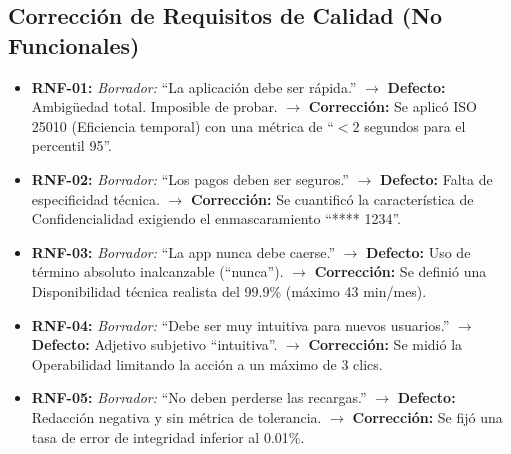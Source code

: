 \documentclass[12pt,a4paper]{article}
\begin{document}
\subsection{Corrección de Requisitos de Calidad (No Funcionales)}
\begin{itemize}
    \item \textbf{RNF-01:} \textit{Borrador:} ``La aplicación debe ser rápida.'' $\rightarrow$ \textbf{Defecto:} Ambigüedad total. Imposible de probar. $\rightarrow$ \textbf{Corrección:} Se aplicó ISO 25010 (Eficiencia temporal) con una métrica de ``$<2$ segundos para el percentil 95''.
    \item \textbf{RNF-02:} \textit{Borrador:} ``Los pagos deben ser seguros.'' $\rightarrow$ \textbf{Defecto:} Falta de especificidad técnica. $\rightarrow$ \textbf{Corrección:} Se cuantificó la característica de Confidencialidad exigiendo el enmascaramiento ``**** 1234''.
    \item \textbf{RNF-03:} \textit{Borrador:} ``La app nunca debe caerse.'' $\rightarrow$ \textbf{Defecto:} Uso de término absoluto inalcanzable (``nunca''). $\rightarrow$ \textbf{Corrección:} Se definió una Disponibilidad técnica realista del 99.9\% (máximo 43 min/mes).
    \item \textbf{RNF-04:} \textit{Borrador:} ``Debe ser muy intuitiva para nuevos usuarios.'' $\rightarrow$ \textbf{Defecto:} Adjetivo subjetivo ``intuitiva''. $\rightarrow$ \textbf{Corrección:} Se midió la Operabilidad limitando la acción a un máximo de 3 clics.
    \item \textbf{RNF-05:} \textit{Borrador:} ``No deben perderse las recargas.'' $\rightarrow$ \textbf{Defecto:} Redacción negativa y sin métrica de tolerancia. $\rightarrow$ \textbf{Corrección:} Se fijó una tasa de error de integridad inferior al 0.01\%.
\end{itemize}
\end{document}
